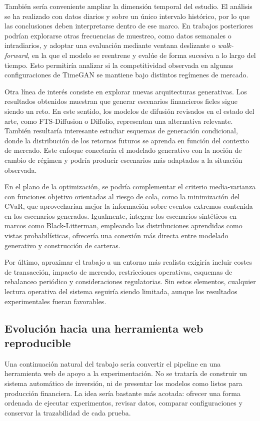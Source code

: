 \documentclass[11pt,a4paper,spanish,oneside]{book}
\numberwithin{equation}{chapter}
\numberwithin{figure}{chapter}
\begin{document}
También sería conveniente ampliar la dimensión temporal del estudio. El análisis se ha realizado con datos diarios y sobre un único intervalo histórico, por lo que las conclusiones deben interpretarse dentro de ese marco. En trabajos posteriores podrían explorarse otras frecuencias de muestreo, como datos semanales o intradiarios, y adoptar una evaluación mediante ventana deslizante o \emph{walk-forward}, en la que el modelo se reentrene y evalúe de forma sucesiva a lo largo del tiempo. Esto permitiría analizar si la competitividad observada en algunas configuraciones de TimeGAN se mantiene bajo distintos regímenes de mercado.

Otra línea de interés consiste en explorar nuevas arquitecturas generativas. Los resultados obtenidos muestran que generar escenarios financieros fieles sigue siendo un reto. En este sentido, los modelos de difusión revisados en el estado del arte, como FTS-Diffusion o Diffolio, representan una alternativa relevante. También resultaría interesante estudiar esquemas de generación condicional, donde la distribución de los retornos futuros se aprenda en función del contexto de mercado. Este enfoque conectaría el modelado generativo con la noción de cambio de régimen y podría producir escenarios más adaptados a la situación observada.

En el plano de la optimización, se podría complementar el criterio media-varianza con funciones objetivo orientadas al riesgo de cola, como la minimización del CVaR, que aprovecharían mejor la información sobre eventos extremos contenida en los escenarios generados. Igualmente, integrar los escenarios sintéticos en marcos como Black-Litterman, empleando las distribuciones aprendidas como vistas probabilísticas, ofrecería una conexión más directa entre modelado generativo y construcción de carteras.

Por último, aproximar el trabajo a un entorno más realista exigiría incluir costes de transacción, impacto de mercado, restricciones operativas, esquemas de rebalanceo periódico y consideraciones regulatorias. Sin estos elementos, cualquier lectura operativa del sistema seguiría siendo limitada, aunque los resultados experimentales fueran favorables.

\subsection{Evolución hacia una herramienta web reproducible}

Una continuación natural del trabajo sería convertir el pipeline en una herramienta web de apoyo a la experimentación. No se trataría de construir un sistema automático de inversión, ni de presentar los modelos como listos para producción financiera. La idea sería bastante más acotada: ofrecer una forma ordenada de ejecutar experimentos, revisar datos, comparar configuraciones y conservar la trazabilidad de cada prueba.
\end{document}
